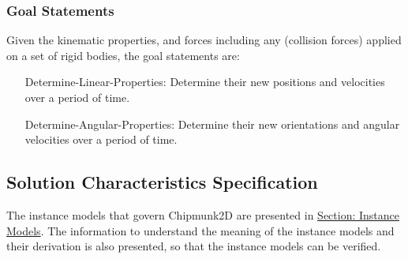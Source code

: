 \documentclass[12pt]{article}
\begin{document}
\subsubsection{Goal Statements}
\label{Sec:GoalStmt}
Given the kinematic properties, and forces including any (collision forces) applied on a set of rigid bodies, the goal statements are:
\begin{itemize}
\item[Determine-Linear-Properties:\phantomsection\label{linearGS}]{Determine their new positions and velocities over a period of time.}
\item[Determine-Angular-Properties:\phantomsection\label{angularGS}]{Determine their new orientations and angular velocities over a period of time.}
\end{itemize}
\subsection{Solution Characteristics Specification}
\label{Sec:SolCharSpec}
The instance models that govern Chipmunk2D are presented in \hyperref[Sec:IMs]{Section: Instance Models}. The information to understand the meaning of the instance models and their derivation is also presented, so that the instance models can be verified.
\end{document}
